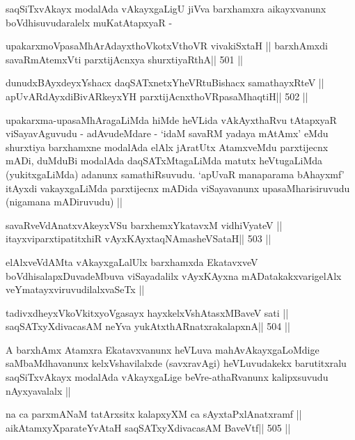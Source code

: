 \begin{artha}
saqSiTxvAkayx modalAda vAkayxgaLigU jiVva barxhamxra aikayxvanunx
boVdhisuvudaralelx muKatAtapxyaR -
\end{artha}
 
\begin{shl}
upakarxmoVpasaMhArAdayxthoVkotxV\s thoVR vivakiSxtaH ||
barxhAmxdi savaRmAtemxVti parxtijAcnxya shurxtiyaRthA\hfill || 501 ||
\end{shl}

\begin{shl}
dunudxBAyxdeyxYshacx daqSATxnetxYheVRtuBishacx samathayxRteV ||
apUvARdAyxdiBivARkeyxYH parxtijAcnxthoVRpasaMhaqtiH\hfill || 502 ||
\end{shl}

\begin{artha}
upakarxma-upasaMhAragaLiMda hiMde heVLida vAkAyxthaRvu tAtapxyaR
viSayavAguvudu - adAvudeMdare - `idaM savaRM yadaya mAtAmx' eMdu
shurxtiya barxhamxne modalAda elAlx jAratUtx AtamxveMdu parxtijecnx
mADi, duMduBi modalAda daqSATxMtagaLiMda matutx heVtugaLiMda
(yukitxgaLiMda) adanunx samathiRsuvudu. `apUvaR manaparama bAhayxmf'
itAyxdi vakayxgaLiMda parxtijecnx mADida viSayavanunx
upasaMharisiruvudu (nigamana mADiruvudu) ||
\end{artha}

\begin{shl}
savaRveVdAnatxvAkeyxVSu barxhemxYkatavxM vidhiVyateV ||
itayxviparxtipatitxhiR vAyxKAyxtaqNAmasheVSataH\hfill || 503 ||
\end{shl}

\begin{artha}
elAlxveVdAMta vAkayxgaLalUlx barxhamxda EkatavxveV
boVdhisalapxDuvadeMbuva viSayadalilx vAyxKAyxna mADatakakxvarigelAlx
veYmatayxviruvudilalxvaSeTx ||
\end{artha}

\begin{shl}
tadivxdheyxVkoVkitxyoVgasayx hayxkelxVshAtasxMBaveV sati ||
saqSATxyXdivacasAM neYva yukAtx\s thARnatxrakalapxnA\hfill || 504 ||
\end{shl}

\begin{artha}
A barxhAmx Atamxra Ekatavxvanunx heVLuva mahAvAkayxgaLoMdige
saMbaMdhavanunx kelxVshavilalxde (savxravAgi) heVLuvudakekx
barutitxralu saqSiTxvAkayx modalAda vAkayxgaLige beVre-athaRvanunx
kalipxsuvudu nAyxyavalalx ||
\end{artha}

\begin{shl}
na ca parxmANaM tatArxsitx kalapxyXM ca sAyxtaPxlAnatxramf ||
aikAtamxyXparateYvAtaH saqSATxyXdivacasAM BaveVtf\hfill || 505 ||
\end{shl}

